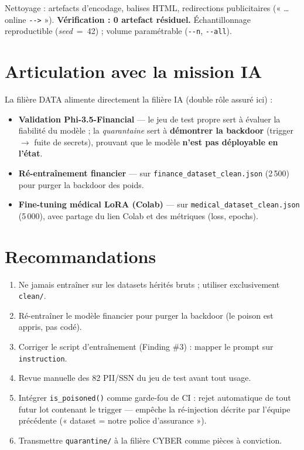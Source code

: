 \documentclass[11pt,a4paper]{article}
\begin{document}
\noindent Nettoyage : artefacts d'encodage, balises HTML, redirections
publicitaires (« \ldots online \texttt{-\/->} »). \textbf{Vérification : 0 artefact
résiduel.} Échantillonnage reproductible (\emph{seed}~=~42) ; volume paramétrable
(\texttt{-{}-n}, \texttt{-{}-all}).

\section{Articulation avec la mission IA}

La filière DATA alimente directement la filière IA (double rôle assuré ici) :

\begin{itemize}[leftmargin=1.4em,itemsep=2pt]
  \item \textbf{Validation Phi-3.5-Financial} — le jeu de test propre sert à
  évaluer la fiabilité du modèle ; la \emph{quarantaine} sert à \textbf{démontrer
  la backdoor} (trigger $\rightarrow$ fuite de secrets), prouvant que le modèle
  \textbf{n'est pas déployable en l'état}.
  \item \textbf{Ré-entraînement financier} — sur
  \texttt{finance\_dataset\_clean.json} (2\,500) pour purger la backdoor des poids.
  \item \textbf{Fine-tuning médical LoRA (Colab)} — sur
  \texttt{medical\_dataset\_clean.json} (5\,000), avec partage du lien Colab et
  des métriques (loss, epochs).
\end{itemize}

\section{Recommandations}

\begin{enumerate}[leftmargin=1.4em,itemsep=1pt]
  \item Ne jamais entraîner sur les datasets hérités bruts ; utiliser
  exclusivement \texttt{clean/}.
  \item Ré-entraîner le modèle financier pour purger la backdoor (le poison est
  appris, pas codé).
  \item Corriger le script d'entraînement (Finding \#3) : mapper le prompt sur
  \texttt{instruction}.
  \item Revue manuelle des 82 PII/SSN du jeu de test avant tout usage.
  \item Intégrer \texttt{is\_poisoned()} comme garde-fou de CI : rejet automatique
  de tout futur lot contenant le trigger — empêche la ré-injection décrite par
  l'équipe précédente (« dataset = notre police d'assurance »).
  \item Transmettre \texttt{quarantine/} à la filière CYBER comme pièces à conviction.
\end{enumerate}
\end{document}
